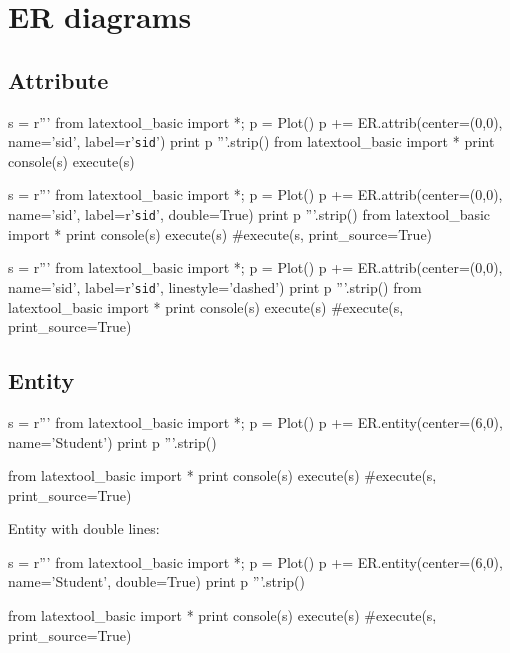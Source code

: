 \section{ER diagrams}

\subsection{Attribute}

\begin{python}
s = r'''
from latextool_basic import *; p = Plot()
p += ER.attrib(center=(0,0), name='sid', label=r'\texttt{sid}')
print p
'''.strip()
from latextool_basic import *
print console(s)
execute(s)
\end{python}

\begin{python}
s = r'''
from latextool_basic import *; p = Plot()
p += ER.attrib(center=(0,0), name='sid', label=r'\texttt{sid}',
               double=True)
print p
'''.strip()
from latextool_basic import *
print console(s)
execute(s)
#execute(s, print_source=True)
\end{python}

\begin{python}
s = r'''
from latextool_basic import *; p = Plot()
p += ER.attrib(center=(0,0), name='sid', label=r'\texttt{sid}', linestyle='dashed')
print p
'''.strip()
from latextool_basic import *
print console(s)
execute(s)
#execute(s, print_source=True)
\end{python}



\newpage
\subsection{Entity}

\begin{python}
s = r'''
from latextool_basic import *; p = Plot()
p += ER.entity(center=(6,0), name='Student')
print p
'''.strip()

from latextool_basic import *
print console(s)
execute(s)
#execute(s, print_source=True)
\end{python}

Entity with double lines:
\begin{python}
s = r'''
from latextool_basic import *; p = Plot()
p += ER.entity(center=(6,0), name='Student', double=True)
print p
'''.strip()

from latextool_basic import *
print console(s)
execute(s)
#execute(s, print_source=True)
\end{python}

